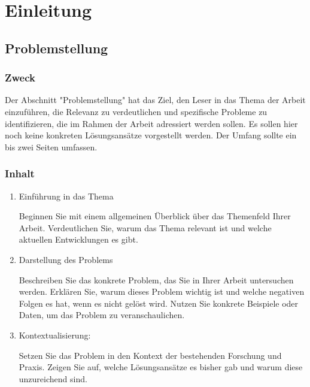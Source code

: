 \chapter{Einleitung}
  \label{chapter:einleitung}


\section{Problemstellung}

\subsection*{Zweck}

Der Abschnitt "Problemstellung" hat das Ziel, den Leser in das Thema der Arbeit
einzuführen, die Relevanz zu verdeutlichen und spezifische Probleme zu
identifizieren, die im Rahmen der Arbeit adressiert werden sollen. Es sollen
hier noch keine konkreten Lösungsansätze vorgestellt werden. Der Umfang sollte
ein bis zwei Seiten umfassen.

\subsection*{Inhalt}

\begin{enumerate}

\item Einführung in das Thema

Beginnen Sie mit einem allgemeinen Überblick über das Themenfeld Ihrer Arbeit.
Verdeutlichen Sie, warum das Thema relevant ist und welche aktuellen
Entwicklungen es gibt.
  
\item Darstellung des Problems

Beschreiben Sie das konkrete Problem, das Sie in Ihrer Arbeit untersuchen
werden. Erklären Sie, warum dieses Problem wichtig ist und welche negativen
Folgen es hat, wenn es nicht gelöst wird. Nutzen Sie konkrete Beispiele oder
Daten, um das Problem zu veranschaulichen.
  
\item Kontextualisierung:

Setzen Sie das Problem in den Kontext der bestehenden Forschung und Praxis.
Zeigen Sie auf, welche Lösungsansätze es bisher gab und warum diese unzureichend
sind.
\end{enumerate}



